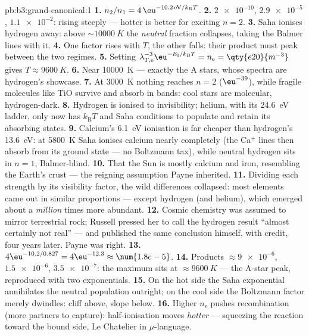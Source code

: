 \begin{solution}{pb:b3:grand-canonical:1}
\textbf{1.} $n_2/n_1 = 4\,\eu^{-10.2\,\text{eV}/k_{\text{B}}T}$.
\textbf{2.} $\num{2e-10}$, $\num{2.9e-5}$, $\num{1.1e-2}$: rising
steeply --- hotter is better for exciting $n = 2$.
\textbf{3.} Saha ionises hydrogen away: above
$\sim\qty{10000}{K}$ the \emph{neutral} fraction collapses, taking
the Balmer lines with it.
\textbf{4.} One factor rises with $T$, the other falls: their
product must peak between the two regimes.
\textbf{5.} Setting $\lambda_{T,\text{e}}^{-3}\eu^{-E_{\text{I}}/
k_{\text{B}}T} = n_{\text{e}} = \qty{e20}{m^{-3}}$ gives $T
\approx \qty{9600}{K}$.
\textbf{6.} Near \qty{10000}{K} --- exactly the A stars, whose
spectra are hydrogen's showcase.
\textbf{7.} At \qty{3000}{K} nothing reaches $n = 2$
($\eu^{-39}$), while fragile molecules like TiO survive and
absorb in bands: cool stars are molecular, hydrogen-dark.
\textbf{8.} Hydrogen is ionised to invisibility; helium, with its
\qty{24.6}{eV} ladder, only now has $k_{\text{B}}T$ and Saha
conditions to populate and retain its absorbing states.
\textbf{9.} Calcium's \qty{6.1}{eV} ionisation is far cheaper
than hydrogen's \qty{13.6}{eV}: at \qty{5800}{K} Saha ionises
calcium nearly completely (the Ca$^+$ lines then absorb from its
ground state --- no Boltzmann tax), while neutral hydrogen sits
in $n = 1$, Balmer-blind.
\textbf{10.} That the Sun is mostly calcium and iron, resembling
the Earth's crust --- the reigning assumption Payne inherited.
\textbf{11.} Dividing each strength by its visibility factor,
the wild differences collapsed: most elements came out in similar
proportions --- except hydrogen (and helium), which emerged
about a \emph{million} times more abundant.
\textbf{12.} Cosmic chemistry was assumed to mirror terrestrial
rock; Russell pressed her to call the hydrogen result ``almost
certainly not real'' --- and published the same conclusion
himself, with credit, four years later. Payne was right.
\textbf{13.} $4\eu^{-10.2/0.827} = 4\eu^{-12.3} \approx
\num{1.8e-5}$.
\textbf{14.} Products $\approx \num{9e-6}$, $\num{1.5e-6}$,
$\num{3.5e-7}$: the maximum sits at $\approx\qty{9600}{K}$ --- the
A-star peak, reproduced with two exponentials.
\textbf{15.} On the hot side the Saha exponential annihilates the
neutral population outright; on the cool side the Boltzmann
factor merely dwindles: cliff above, slope below.
\textbf{16.} Higher $n_{\text{e}}$ pushes recombination (more
partners to capture): half-ionisation moves \emph{hotter} ---
squeezing the reaction toward the bound side, Le Chatelier in
$\mu$-language.

\end{solution}

